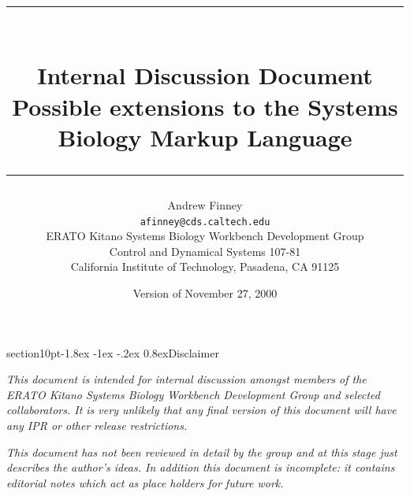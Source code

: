 \documentclass[10pt]{article}
\makeatletter
\renewcommand{\section}{\@startsection%
  {section}{1}{0pt}{-1.8ex \@plus -1ex \@minus -.2ex}%
  {0.8ex}{\normalfont\Large\bfseries\sffamily}}
\makeatother
\begin{document}





\title{\rule{\textwidth}{0.01in}\\[3 pt]
\textbf{\textsf{Internal Discussion Document}\\Possible extensions to the Systems Biology Markup Language}\\[-6 pt]
\rule{\textwidth}{0.01in}}



\author{Andrew Finney\\[-2 pt]
\normalsize \texttt{afinney@cds.caltech.edu}\\[-4pt]
\normalsize ERATO Kitano Systems Biology Workbench Development Group\\[-4pt]
\normalsize Control and Dynamical Systems 107-81\\[-4pt]
\normalsize California Institute of Technology, Pasadena, CA 91125\\[4pt]
\normalsize }
\date{Version of November 27, 2000}
\maketitle







\setcounter{tocdepth}{2}
\addtolength{\parskip}{-1.2 ex}
\small
\tableofcontents
\normalsize
\addtolength{\parskip}{1.2 ex}            %
\newpage

\section{Disclaimer}

\emph{This document is intended for internal discussion amongst
members of the ERATO Kitano Systems Biology Workbench Development
Group and selected collaborators.  It is very unlikely that any
final version of this document will have any IPR or other release
restrictions.}

\emph{This document has not been reviewed in detail by the group and at
this stage just describes the author's ideas.  In addition this
document is incomplete: it contains editorial notes which act as
place holders for future work.}
\end{document}
